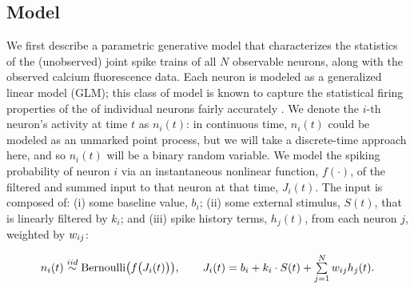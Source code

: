 \long{}


\subsection{Model} 
\label{sec:methods:markov-setup} 

We first describe a parametric generative model that characterizes the statistics of the (unobserved) joint spike trains of all $N$ observable neurons, along with the observed calcium fluorescence data. Each neuron is modeled as a generalized linear model (GLM); this class of model is known to capture the statistical firing properties of the of individual neurons fairly accurately \cite{BRIL88, CSK88, BRIL92, PG00, PILL07, PAN03d, PAN04c, Rigat06, TRUC05,NYK06,KP06,Vidne08,Stevenson2009}. We denote the $i$-th neuron's activity at time $t$ as $n_i(t)$: in continuous time, $n_i(t)$ could be modeled as an unmarked point process, but we will take a discrete-time approach here, and so $n_i(t)$ will be a binary random variable. We model the spiking probability of neuron $i$ via an instantaneous nonlinear function, $f(\cdot)$, of the filtered and summed input to that neuron at that time, $J_i(t)$. The input is composed of: (i) some baseline value, $b_i$; (ii) some external stimulus, $S(t)$, that is linearly filtered by $k_i$; and (iii) spike history terms, $h_j(t)$, from each neuron $j$, weighted by $w_{ij}$:

\begin{equation} \label{eqn:glm:definition}
\begin{array}{l}
n_i(t)\overset{iid}{\sim} \text{Bernoulli}\big(f\big(J_i(t) \big)
\big), \qquad J_i(t)=b_i+k_i\cdot S(t)+\sum \limits_{j=1}^{N} \w_{ij}
h_{j}(t).
\end{array}
\end{equation}


